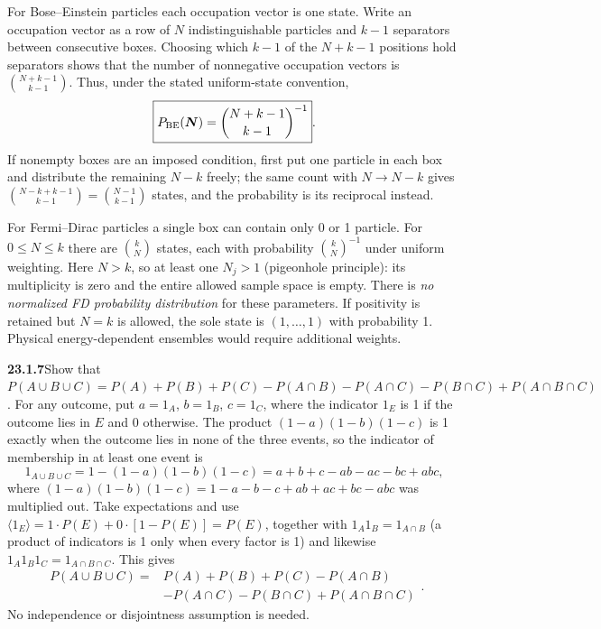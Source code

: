 For Bose--Einstein particles each occupation vector is one state.
Write an occupation vector as a row of $N$ indistinguishable particles
and $k-1$ separators between consecutive boxes. Choosing which $k-1$ of
the $N+k-1$ positions hold separators shows that the number of
nonnegative occupation vectors is $\binom{N+k-1}{k-1}$.
Thus, under the stated uniform-state convention,
\[
\boxed{P_{\rm BE}(\boldsymbol N)=\binom{N+k-1}{k-1}^{-1}}.
\]
If nonempty boxes are an imposed condition, first put one particle in
each box and distribute the remaining $N-k$ freely; the same count with
$N\to N-k$ gives $\binom{N-k+k-1}{k-1}=\binom{N-1}{k-1}$ states, and
the probability is its reciprocal instead.

For Fermi--Dirac particles a single box can contain only 0 or 1 particle.
For $0\le N\le k$ there are $\binom kN$ states, each with probability
$\binom kN^{-1}$ under uniform weighting. Here $N>k$, so at least one
$N_j>1$ (pigeonhole principle): its multiplicity is zero and the
entire allowed sample space is empty. There is \emph{no normalized FD
probability distribution}
for these parameters. If positivity is retained but $N=k$ is allowed,
the sole state is $(1,\ldots,1)$ with probability 1.
Physical energy-dependent ensembles would require additional weights.


\par\bigskip
\noindent\textbf{23.1.7}\quad Show that
$P(A\cup B\cup C)=P(A)+P(B)+P(C)-P(A\cap B)-P(A\cap C)
-P(B\cap C)+P(A\cap B\cap C)$.
\solution
For any outcome, put $a=1_A$, $b=1_B$, $c=1_C$, where the indicator
$1_E$ is 1 if the outcome lies in $E$ and 0 otherwise. The product
$(1-a)(1-b)(1-c)$ is 1 exactly when the outcome lies in none of the
three events, so the indicator of membership in at least one event is
\[
1_{A\cup B\cup C}=1-(1-a)(1-b)(1-c)
=a+b+c-ab-ac-bc+abc,
\]
where $(1-a)(1-b)(1-c)=1-a-b-c+ab+ac+bc-abc$ was multiplied out.
Take expectations and use
$\langle1_E\rangle=1\cdot P(E)+0\cdot[1-P(E)]=P(E)$, together with
$1_A1_B=1_{A\cap B}$ (a product of indicators is 1 only when every
factor is 1) and likewise $1_A1_B1_C=1_{A\cap B\cap C}$. This gives
\[
\boxed{\begin{aligned}
P(A\cup B\cup C)={}&P(A)+P(B)+P(C)-P(A\cap B)\\
 &-P(A\cap C)-P(B\cap C)+P(A\cap B\cap C)
\end{aligned}}.
\]
No independence or disjointness assumption is needed.


